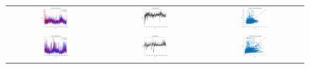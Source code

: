 \begin{figure}[ht!]
  \centering
  \begin{tabular}{ccc}
    \includegraphics[width=0.32\textwidth]{graphs/hybrid/336 hours/mean_fr/actual vs forecast.jpg} &
    \includegraphics[width=0.32\textwidth]{graphs/hybrid/336 hours/mean_fr/residuals.jpg} &
    \includegraphics[width=0.32\textwidth]{graphs/hybrid/336 hours/mean_fr/scatter plot.jpg} \\
    \includegraphics[width=0.32\textwidth]{graphs/hybrid/336 hours/s_wht/actual vs forecast.jpg} &
    \includegraphics[width=0.32\textwidth]{graphs/hybrid/336 hours/s_wht/residuals.jpg} &
    \includegraphics[width=0.32\textwidth]{graphs/hybrid/336 hours/s_wht/scatter plot.jpg} \\

\end{tabular}
\end{figure}
